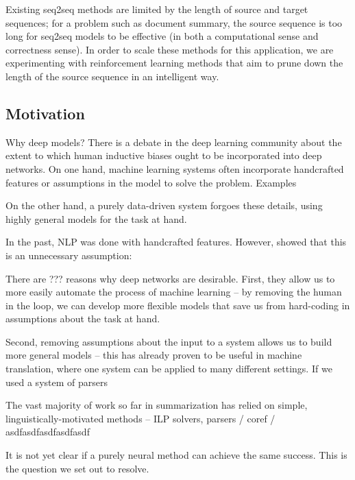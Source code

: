 \documentclass[11pt]{report}
\begin{document}
Existing seq2seq methods are limited by the length of source and target sequences; for a problem such as document summary, the source sequence is too long for seq2seq models to be effective (in both a computational sense and correctness sense). In order to scale these methods for this application, we are experimenting with reinforcement learning methods that aim to prune down the length of the source sequence in an intelligent way.



\subsection{Motivation}


Why deep models? There is a debate in the deep learning community about the extent to which human inductive biases ought to be incorporated into deep networks. On one hand, machine learning systems often incorporate handcrafted features or assumptions in the model to solve the problem. Examples %

On the other hand, a purely data-driven system forgoes these details, using highly general models for the task at hand.

In the past, NLP was done with handcrafted features. However, \cite{Collobert2011} showed that this is an unnecessary assumption: %


There are ??? reasons why deep networks are desirable. First, they allow us to more easily automate the process of machine learning -- by removing the human in the loop, we can develop more flexible models that save us from hard-coding in assumptions about the task at hand. %

Second, removing assumptions about the input to a system allows us to build more general models -- this has already proven to be useful in machine translation, where one system can be applied to many different settings. If we used a system of parsers  %

The vast majority of work so far in summarization has relied on simple, linguistically-motivated methods -- ILP solvers, parsers / coref / asdfasdfasdfasdfasdf

It is not yet clear if a purely neural method can achieve the same success. This is the question we set out to resolve.
\end{document}
